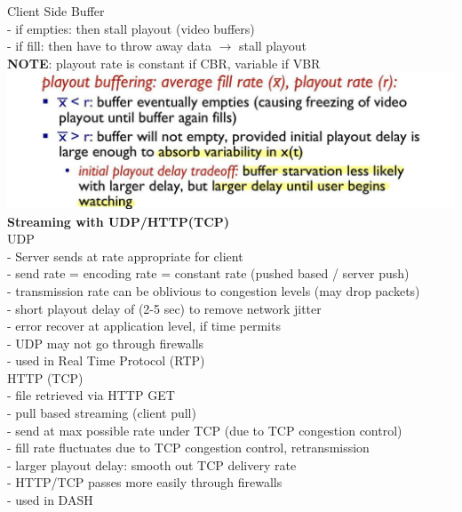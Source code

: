 \documentclass[10pt, a4paper]{article}
\newcommand{\highlight}[1]{{\color{red}\textbf{#1}}}
\newcommand{\blue}[1]{{\color{MidnightBlue}#1}}
\newcommand{\red}[1]{{\color{red}#1}}
\newcommand{\green}[1]{{\color{ForestGreen}#1}}
\newcommand{\tab}[0]{\hspace*{2mm}}
\begin{document}
\begin{multicols*}{3}
		Client Side Buffer\\
		- if \red{empties}: then stall playout (video buffers)\\
		- if \red{fill}: then have to throw away data $\rightarrow$ stall playout\\
		\highlight{NOTE}: playout rate is \blue{constant} if \blue{CBR}, \green{variable} if \green{VBR}\\
		\includegraphics[scale=.2]{./assets/playoutBuffering}\\

		\textbf{Streaming with UDP/HTTP(TCP)}\\
		UDP\\
		- Server sends at rate appropriate for client\\
		\tab - send rate = encoding rate = constant rate (pushed based / server push)\\
		\tab - transmission rate can be \red{oblivious to congestion levels} (may drop packets)\\
		- short playout delay of (2-5 sec) to remove network jitter\\
		- error recover at \blue{application level}, if time permits\\
		- UDP may not go through firewalls\\
		- used in Real Time Protocol (RTP)\\

		HTTP (TCP)\\
		- file retrieved via HTTP GET\\
		\tab - pull based streaming (client pull)\\
		- send at \blue{max possible rate} under TCP (due to TCP congestion control)\\
		- fill rate fluctuates due to TCP congestion control, retransmission\\
		- larger playout delay: smooth out TCP delivery rate\\
		- HTTP/TCP passes more easily through firewalls\\
		- used in DASH\\


\end{multicols*}
\end{document}
